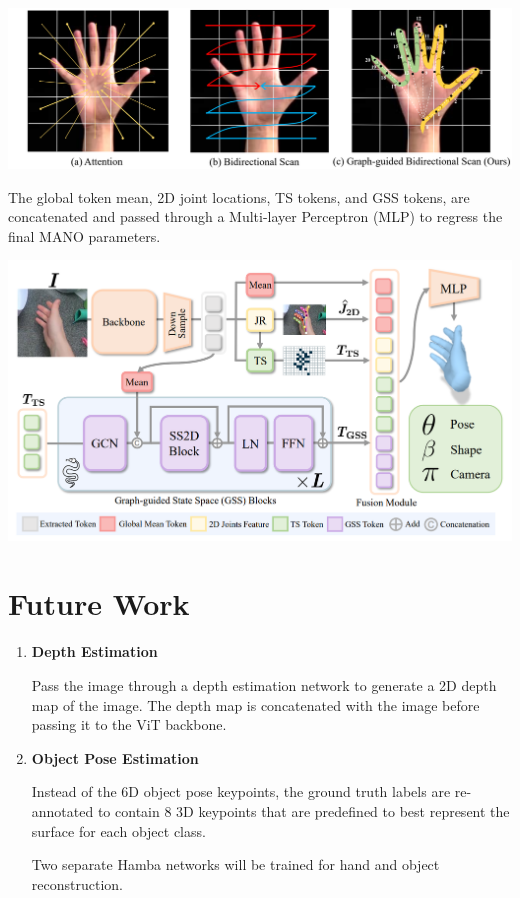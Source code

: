 \documentclass{article}
\begin{document}
\begin{center}
    \includegraphics[scale=0.25]{hamba-3.png}
\end{center}

The global token mean, 2D joint locations, TS tokens, and GSS tokens, are concatenated and passed through a Multi-layer Perceptron (MLP) to regress the final MANO parameters.

\begin{center}
    \includegraphics[scale=0.35]{hamba-1.png}
\end{center}

\pagebreak

\section*{Future Work}
\begin{enumerate}
    \item \textbf{Depth Estimation}
    
    Pass the image through a depth estimation network to generate a 2D depth map of the image. The depth map is concatenated with the image before passing it to the ViT backbone.

    \item \textbf{Object Pose Estimation}
    
    Instead of the 6D object pose keypoints, the ground truth labels are re-annotated to contain 8 3D keypoints that are predefined to best represent the surface for each object class.
    \vspace{1em}

    Two separate Hamba networks will be trained for hand and object reconstruction.
\end{enumerate}
\end{document}
